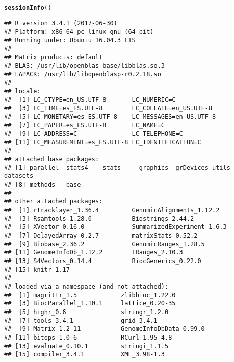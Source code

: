 \documentclass{article}\usepackage[]{graphicx}\usepackage[]{color}
\makeatletter
\newcommand{\hlstd}[1]{\textcolor[rgb]{0.345,0.345,0.345}{#1}}%
\newcommand{\hlkwd}[1]{\textcolor[rgb]{0.737,0.353,0.396}{\textbf{#1}}}%
\newenvironment{kframe}{%
 \def\at@end@of@kframe{}%
 \ifinner\ifhmode%
  \def\at@end@of@kframe{\end{minipage}}%
  \begin{minipage}{\columnwidth}%
 \fi\fi%
 \def\FrameCommand##1{\hskip\@totalleftmargin \hskip-\fboxsep
 \colorbox{shadecolor}{##1}\hskip-\fboxsep
     \hskip-\linewidth \hskip-\@totalleftmargin \hskip\columnwidth}%
 \MakeFramed {\advance\hsize-\width
   \@totalleftmargin\z@ \linewidth\hsize
   \@setminipage}}%
 {\par\unskip\endMakeFramed%
 \at@end@of@kframe}
\newenvironment{knitrout}{}{} %
\makeatother
\begin{document}
\begin{knitrout}
\color{fgcolor}\begin{kframe}
\begin{alltt}
\hlkwd{sessionInfo}\hlstd{()}
\end{alltt}
\begin{verbatim}
## R version 3.4.1 (2017-06-30)
## Platform: x86_64-pc-linux-gnu (64-bit)
## Running under: Ubuntu 16.04.3 LTS
## 
## Matrix products: default
## BLAS: /usr/lib/openblas-base/libblas.so.3
## LAPACK: /usr/lib/libopenblasp-r0.2.18.so
## 
## locale:
##  [1] LC_CTYPE=en_US.UTF-8       LC_NUMERIC=C              
##  [3] LC_TIME=es_ES.UTF-8        LC_COLLATE=en_US.UTF-8    
##  [5] LC_MONETARY=es_ES.UTF-8    LC_MESSAGES=en_US.UTF-8   
##  [7] LC_PAPER=es_ES.UTF-8       LC_NAME=C                 
##  [9] LC_ADDRESS=C               LC_TELEPHONE=C            
## [11] LC_MEASUREMENT=es_ES.UTF-8 LC_IDENTIFICATION=C       
## 
## attached base packages:
## [1] parallel  stats4    stats     graphics  grDevices utils     datasets 
## [8] methods   base     
## 
## other attached packages:
##  [1] rtracklayer_1.36.4         GenomicAlignments_1.12.2  
##  [3] Rsamtools_1.28.0           Biostrings_2.44.2         
##  [5] XVector_0.16.0             SummarizedExperiment_1.6.3
##  [7] DelayedArray_0.2.7         matrixStats_0.52.2        
##  [9] Biobase_2.36.2             GenomicRanges_1.28.5      
## [11] GenomeInfoDb_1.12.2        IRanges_2.10.3            
## [13] S4Vectors_0.14.4           BiocGenerics_0.22.0       
## [15] knitr_1.17                
## 
## loaded via a namespace (and not attached):
##  [1] magrittr_1.5            zlibbioc_1.22.0        
##  [3] BiocParallel_1.10.1     lattice_0.20-35        
##  [5] highr_0.6               stringr_1.2.0          
##  [7] tools_3.4.1             grid_3.4.1             
##  [9] Matrix_1.2-11           GenomeInfoDbData_0.99.0
## [11] bitops_1.0-6            RCurl_1.95-4.8         
## [13] evaluate_0.10.1         stringi_1.1.5          
## [15] compiler_3.4.1          XML_3.98-1.3
\end{verbatim}
\end{kframe}
\end{knitrout}
\end{document}

